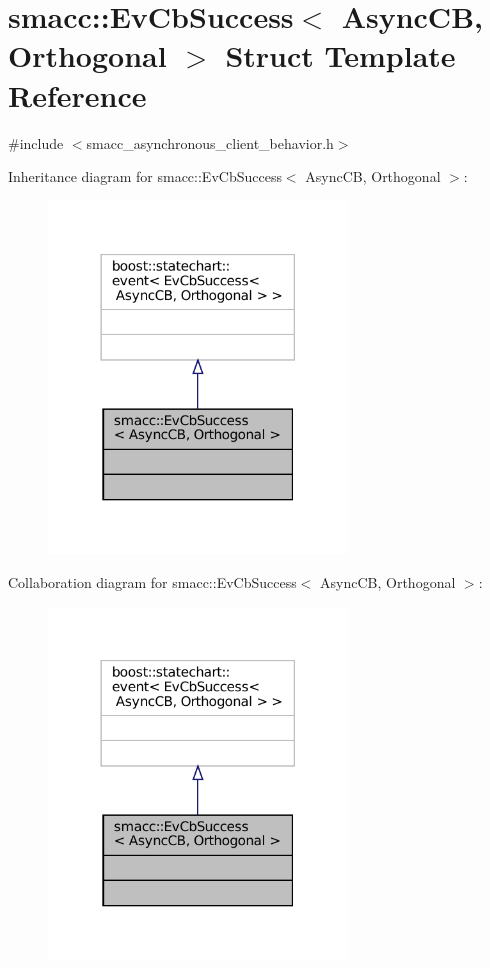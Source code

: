 \hypertarget{structsmacc_1_1EvCbSuccess}{}\section{smacc\+:\+:Ev\+Cb\+Success$<$ Async\+CB, Orthogonal $>$ Struct Template Reference}
\label{structsmacc_1_1EvCbSuccess}


{\ttfamily \#include $<$smacc\+\_\+asynchronous\+\_\+client\+\_\+behavior.\+h$>$}



Inheritance diagram for smacc\+:\+:Ev\+Cb\+Success$<$ Async\+CB, Orthogonal $>$\+:
\nopagebreak
\begin{figure}[H]
\begin{center}
\leavevmode
\includegraphics[width=225pt]{structsmacc_1_1EvCbSuccess__inherit__graph}
\end{center}
\end{figure}


Collaboration diagram for smacc\+:\+:Ev\+Cb\+Success$<$ Async\+CB, Orthogonal $>$\+:
\nopagebreak
\begin{figure}[H]
\begin{center}
\leavevmode
\includegraphics[width=225pt]{structsmacc_1_1EvCbSuccess__coll__graph}
\end{center}
\end{figure}


